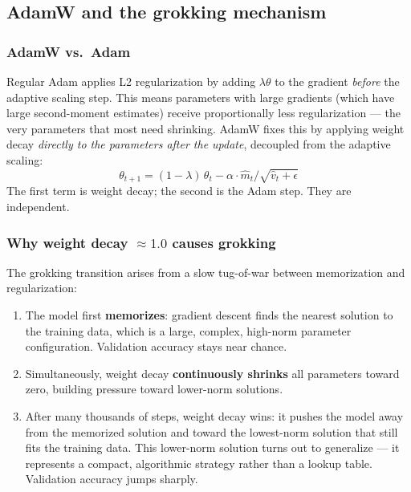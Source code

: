 \documentclass[11pt, a4paper]{article}
\begin{document}
\subsection{AdamW and the grokking mechanism}

\subsubsection{AdamW vs.\ Adam}

Regular Adam applies L2 regularization by adding
$\lambda \theta$ to the gradient \emph{before} the adaptive scaling step.
This means parameters with large gradients (which have large second-moment
estimates) receive proportionally less regularization --- the very parameters
that most need shrinking. AdamW fixes this by applying weight decay
\emph{directly to the parameters after the update}, decoupled from the
adaptive scaling:
\[
  \theta_{t+1} = (1 - \lambda)\,\theta_t - \alpha \cdot \hat{m}_t / \sqrt{\hat{v}_t + \epsilon}
\]
The first term is weight decay; the second is the Adam step. They are
independent.

\subsubsection{Why weight decay $\approx 1.0$ causes grokking}

The grokking transition arises from a slow tug-of-war between memorization
and regularization:

\begin{enumerate}[noitemsep]
  \item The model first \textbf{memorizes}: gradient descent finds the nearest
        solution to the training data, which is a large, complex, high-norm
        parameter configuration. Validation accuracy stays near chance.

  \item Simultaneously, weight decay \textbf{continuously shrinks} all
        parameters toward zero, building pressure toward lower-norm solutions.

  \item After many thousands of steps, weight decay wins: it pushes the model
        away from the memorized solution and toward the lowest-norm solution
        that still fits the training data. This lower-norm solution turns out
        to generalize --- it represents a compact, algorithmic strategy rather
        than a lookup table. Validation accuracy jumps sharply.
\end{enumerate}
\end{document}
